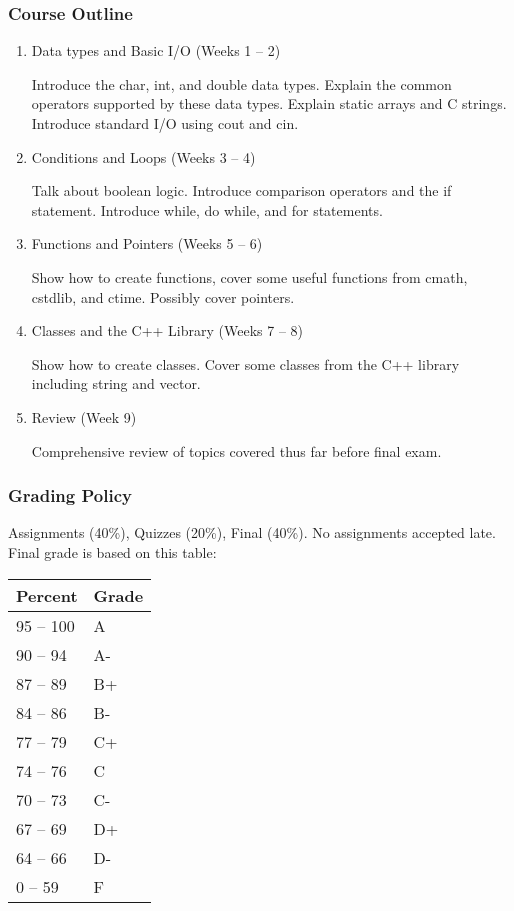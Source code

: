 \documentclass[a4paper,12pt]{article}
\begin{document}
\subsubsection*{Course Outline}
\begin{enumerate}

\item Data types and Basic I/O (Weeks 1 -- 2) 

Introduce the char, int, and double data types. Explain the common operators supported by these data types. Explain static arrays and C strings. Introduce standard I/O using cout and cin.

\item Conditions and Loops (Weeks 3 -- 4) 

Talk about boolean logic. Introduce comparison operators and the if statement. Introduce while, do while, and for statements. 

\item Functions and Pointers (Weeks 5 -- 6)

Show how to create functions, cover some useful functions from cmath, cstdlib, and ctime. Possibly cover pointers.

\item Classes and the C++ Library (Weeks 7 -- 8)

Show how to create classes. Cover some classes from the C++ library including string and vector.

\item Review (Week 9) 

Comprehensive review of topics covered thus far before final exam.

\end{enumerate}

\subsubsection*{Grading Policy}

Assignments (40\%), Quizzes (20\%), Final (40\%). No assignments accepted late. \\

Final grade is based on this table: \\

\begin{tabular}{|l|l|}
\hline
Percent & Grade \\
\hline
95 -- 100 & A \\
\hline
90 -- 94 & A- \\
\hline
87 -- 89 & B+ \\
\hline
84 -- 86 & B- \\
\hline
77 -- 79 & C+ \\
\hline
74 -- 76 & C \\
\hline
70 -- 73 & C- \\
\hline
67 -- 69 & D+ \\
\hline
64 -- 66 & D- \\
\hline
0 -- 59 & F \\
\hline
\end{tabular}
\end{document}
